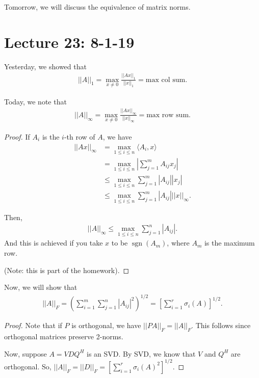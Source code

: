 \documentclass{article}
\DeclareMathOperator{\sgn}{sgn}
\begin{document}
Tomorrow, we will discuss the equivalence of matrix norms.

\section{Lecture 23: 8-1-19}

Yesterday, we showed that
\begin{align*}
  ||A||_1 = \max_{x \neq 0} \frac{||A x||_1}{||x||_1} = \text{max col sum}.
\end{align*}

Today, we note that
\begin{align*}
  ||A||_{\infty} = \max_{x \neq 0} \frac{||A x||_{\infty}}{||x||_{\infty}} = \text{max row sum}.
\end{align*}

\begin{proof}
  If $A_i$ is the $i$-th row of $A$, we have
\begin{align*}
  ||A x||_{\infty} &= \max_{1 \leq i \leq n} \langle A_i, x\rangle \\
&= \max_{1 \leq i \leq n} \left | \sum_{j=1}^{m} A_{ij} x_j \right | \\
&\leq \max_{1 \leq i \leq n} \sum_{j=1}^{m} |A_{ij}| |x_j| \\
& \leq  \max_{1 \leq i \leq n} \sum_{j=1}^{m} |A_{ij}| ||x||_{\infty}.
\end{align*}

Then,
\begin{align*}
  ||A||_{\infty} \leq \max_{1 \leq i \leq n} \sum_{j=1}^{n} |A_{ij}|.
\end{align*}
And this is achieved if you take $x$ to be $\sgn(A_m)$, where $A_m$ is the maximum row.

(Note: this is part of the homework).
\end{proof}

Now, we will show that
\begin{align*}
  ||A||_F = \left( \sum_{i=1}^{m} \sum_{j=1}^{n} |A_{ij}|^2 \right)^{1/2} = \left[ \sum_{i=1}^{r} \sigma_i(A) \right]^{1/2}.
\end{align*}

\begin{proof}
  Note that if $P$ is orthogonal, we have $||PA||_F = ||A||_F$.  This follows since orthogonal matrices preserve 2-norms.

  Now, suppose $A = VDQ^H$ is an SVD.  By SVD, we know that $V$ and $Q^H$ are orthogonal.  So, $||A||_F = ||D||_F = \left [ \sum_{i=1}^{r} \sigma_i(A)^2 \right ]^{1/2}$.
\end{proof}
\end{document}
